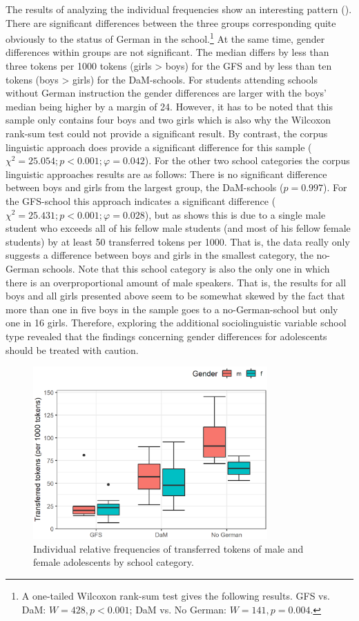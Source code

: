 \documentclass[output=paper]{langsci/langscibook}
\begin{document}
The results of analyzing the individual frequencies show an interesting pattern (). There are significant differences between the three groups corresponding quite obviously to the status of German in the school.\footnote{A one-tailed Wilcoxon rank-sum test gives the following results. GFS vs. DaM: $W = 428, p < 0.001$; DaM vs. No German: $W = 141, p = 0.004$.} At the same time, gender differences within groups are not significant. The median differs by less than three tokens per 1000 tokens (girls > boys) for the GFS and by less than ten tokens (boys > girls) for the DaM-schools. For students attending schools without German instruction the gender differences are larger with the boys’ median being higher by a margin of 24. However, it has to be noted that this sample only contains four boys and two girls which is also why the Wilcoxon rank-sum test could not provide a significant result. By contrast, the corpus linguistic approach does provide a significant difference for this sample ($\chi^2 = 25.054; p < 0.001; \varphi = 0.042$). For the other two school categories the corpus linguistic approaches results are as follows: There is no significant difference between boys and girls from the largest group, the DaM-schools ($p = 0.997$). For the GFS-school this approach indicates a significant difference ($\chi^2 = 25.431; p < 0.001; \varphi = 0.028$), but as  shows this is due to a single male student who exceeds all of his fellow male students (and most of his fellow female students) by at least 50 transferred tokens per 1000. That is, the data really only suggests a difference between boys and girls in the smallest category, the no-German schools. Note that this school category is also the only one in which there is an overproportional amount of male speakers. That is, the results for all boys and all girls presented above seem to be somewhat skewed by the fact that more than one in five boys in the sample goes to a no-German-school but only one in 16 girls. Therefore, exploring the additional sociolinguistic variable school type revealed that the findings concerning gender differences for adolescents should be treated with caution.

  
\begin{figure}
\includegraphics[width=0.8\textwidth]{figures/brackefig2.png}
 \caption{Individual relative frequencies of transferred tokens of male and female adolescents by school category.}
 \label{fig:bracke:2}
 \end{figure}
  
\end{document}
